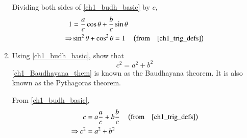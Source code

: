 \begin{enumerate}[label=\arabic*.,ref=\thesubsection.\theenumi]
%
\solution Dividing both sides of \eqref{ch1_budh_basic} by $c$, 
\begin{align}
1 &= \frac{a}{c}\cos\theta + \frac{b}{c}\sin\theta\\
\Rightarrow &\sin ^2 \theta + \cos ^2 \theta = 1 \quad \left(\text{from} \quad \eqref{ch1_trig_defs}\right)
\end{align}

\item
	Using \eqref{ch1_budh_basic}, show that
	\begin{equation}
	\label{ch1_Baudhayana_them}
	c^2 = a^2 + b^2
	\end{equation}
	\eqref{ch1_Baudhayana_them} is known as the Baudhayana theorem.  It is also known as the Pythagoras theorem.

\solution From \eqref{ch1_budh_basic},
\begin{align}
c &= a\frac{a}{c} + b \frac{b}{c} \quad \left(\text{from} \quad \eqref{ch1_trig_defs}\right)\\
\Rightarrow c^2 &= a^2 + b^2
\end{align}
\end{enumerate}
